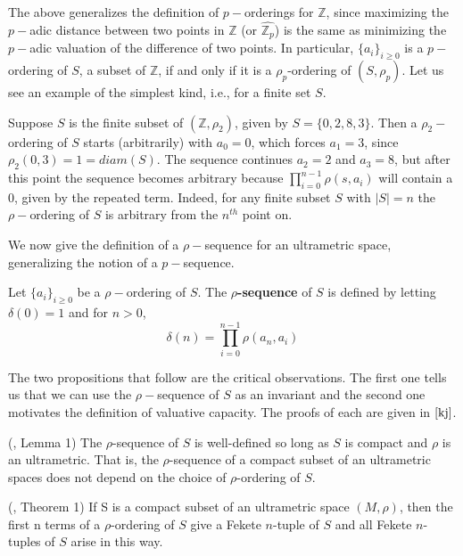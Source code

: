 The above generalizes the definition of $p-$orderings for $\mathbb{Z}$, since maximizing the $p-$adic distance between two points in $\mathbb{Z}$ (or $\widehat{\mathbb{Z}_p}$) is the same as minimizing the $p-$adic valuation of the difference of two points. In particular, $\{a_i\}_{i \geq 0}$ is a $p-$ordering of $S$, a subset of $\mathbb{Z}$, if and only if it is a $\rho_p$-ordering of $(S, \rho_p)$. Let us see an example of the simplest kind, i.e., for a finite set $S$.\\

\begin{example}
Suppose $S$ is the finite subset of $(\mathbb{Z}, \rho_2)$, given by $S=\{0,2,8,3\}$. Then a $\rho_2-$ordering of $S$ starts (arbitrarily) with $a_0=0$, which forces $a_1=3$, since $\rho_2(0,3)=1=diam(S)$. The sequence continues $a_2=2$ and $a_3=8$, but after this point the sequence becomes arbitrary because  $\prod_{i=0}^{n-1} \rho(s,a_i)$ will contain a $0$, given by the repeated term. Indeed, for any finite subset $S$ with $\lvert S \rvert = n$ the $\rho-$ordering of $S$ is arbitrary from the $n^{th}$ point on. 
\end{example}

We now give the definition of a $\rho-$sequence for an ultrametric space, generalizing the notion of a $p-$sequence.\\

\begin{definition}
	\cite{kj} Let $\{a_i\}_{i \geq 0}$ be a $\rho-$ordering of $S$. The \textbf{$\rho$-sequence} of $S$ is defined by letting $\delta(0)=1$  and for $n > 0$, \[\delta(n)=\prod_{i=0}^{n-1} \rho(a_n,a_i)\]
\end{definition}

The two propositions that follow are the critical observations. The first one tells us that we can use the $\rho-$sequence of $S$ as an invariant and the second one motivates the definition of valuative capacity. The proofs of each are given in $\cite{kj}$.\\

\begin{proposition}
	(\cite{kj}, Lemma 1) The $\rho$-sequence of $S$ is well-defined so long as $S$ is compact and $\rho$ is an ultrametric. That is, the $\rho$-sequence of a compact subset of an ultrametric spaces does not depend on the choice of $\rho$-ordering of $S$.
\end{proposition}

\begin{proposition} (\cite{kj}, Theorem 1)
If S is a compact subset of an ultrametric space $(M, \rho)$, then the first n terms of a $\rho$-ordering of $S$ give a Fekete $n$-tuple of $S$ and all Fekete $n$-tuples of $S$ arise in this way.
\end{proposition}

